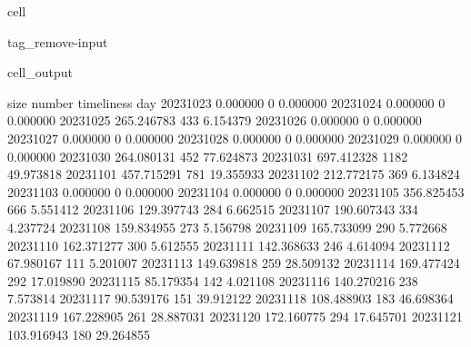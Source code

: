 \documentclass[letterpaper,10pt,english]{jupyterBook}
\begin{document}
\begin{sphinxuseclass}{cell}
\begin{sphinxuseclass}{tag_remove-input}\begin{sphinxVerbatimOutput}

\begin{sphinxuseclass}{cell_output}
\begin{sphinxVerbatim}[commandchars=\\\{\}]
                  size  number  timeliness
day                                       
2023\PYGZhy{}10\PYGZhy{}23    0.000000       0    0.000000
2023\PYGZhy{}10\PYGZhy{}24    0.000000       0    0.000000
2023\PYGZhy{}10\PYGZhy{}25  265.246783     433    6.154379
2023\PYGZhy{}10\PYGZhy{}26    0.000000       0    0.000000
2023\PYGZhy{}10\PYGZhy{}27    0.000000       0    0.000000
2023\PYGZhy{}10\PYGZhy{}28    0.000000       0    0.000000
2023\PYGZhy{}10\PYGZhy{}29    0.000000       0    0.000000
2023\PYGZhy{}10\PYGZhy{}30  264.080131     452   77.624873
2023\PYGZhy{}10\PYGZhy{}31  697.412328    1182   49.973818
2023\PYGZhy{}11\PYGZhy{}01  457.715291     781   19.355933
2023\PYGZhy{}11\PYGZhy{}02  212.772175     369    6.134824
2023\PYGZhy{}11\PYGZhy{}03    0.000000       0    0.000000
2023\PYGZhy{}11\PYGZhy{}04    0.000000       0    0.000000
2023\PYGZhy{}11\PYGZhy{}05  356.825453     666    5.551412
2023\PYGZhy{}11\PYGZhy{}06  129.397743     284    6.662515
2023\PYGZhy{}11\PYGZhy{}07  190.607343     334    4.237724
2023\PYGZhy{}11\PYGZhy{}08  159.834955     273    5.156798
2023\PYGZhy{}11\PYGZhy{}09  165.733099     290    5.772668
2023\PYGZhy{}11\PYGZhy{}10  162.371277     300    5.612555
2023\PYGZhy{}11\PYGZhy{}11  142.368633     246    4.614094
2023\PYGZhy{}11\PYGZhy{}12   67.980167     111    5.201007
2023\PYGZhy{}11\PYGZhy{}13  149.639818     259   28.509132
2023\PYGZhy{}11\PYGZhy{}14  169.477424     292   17.019890
2023\PYGZhy{}11\PYGZhy{}15   85.179354     142    4.021108
2023\PYGZhy{}11\PYGZhy{}16  140.270216     238    7.573814
2023\PYGZhy{}11\PYGZhy{}17   90.539176     151   39.912122
2023\PYGZhy{}11\PYGZhy{}18  108.488903     183   46.698364
2023\PYGZhy{}11\PYGZhy{}19  167.228905     261   28.887031
2023\PYGZhy{}11\PYGZhy{}20  172.160775     294   17.645701
2023\PYGZhy{}11\PYGZhy{}21  103.916943     180   29.264855
\end{sphinxVerbatim}

\end{sphinxuseclass}\end{sphinxVerbatimOutput}

\end{sphinxuseclass}
\end{sphinxuseclass}
\sphinxstepscope
\end{document}
